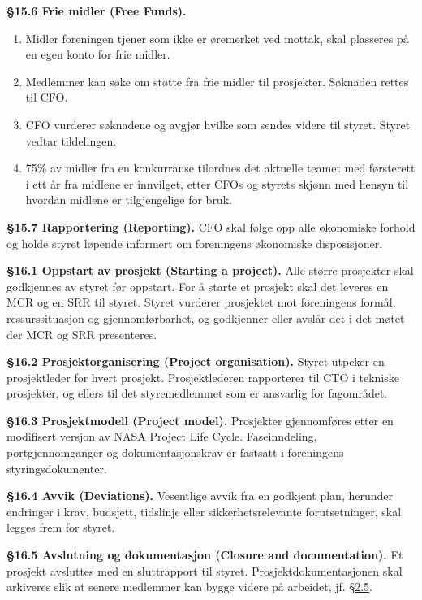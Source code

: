 \documentclass{../../../Common/Latex/Templates/rapport}
\begin{document}
\textbf{\S 15.6 Frie midler (Free Funds).}\label{bylaw:15.6}
\begin{enumerate}
  \item Midler foreningen tjener som ikke er øremerket ved mottak, skal plasseres på en egen konto for frie midler.
  \item Medlemmer kan søke om støtte fra frie midler til prosjekter. Søknaden rettes til CFO.
  \item CFO vurderer søknadene og avgjør hvilke som sendes videre til styret. Styret vedtar tildelingen.
  \item 75\% av midler fra en konkurranse tilordnes det aktuelle teamet med førsterett i ett år fra midlene er innvilget, etter CFOs og styrets skjønn med hensyn til hvordan midlene er tilgjengelige for bruk.
\end{enumerate}

\textbf{\S 15.7 Rapportering (Reporting).}\label{bylaw:15.7} CFO skal følge opp alle økonomiske forhold og holde styret løpende informert om foreningens økonomiske disposisjoner.

\label{bylaw:16}
\textbf{\S 16.1 Oppstart av prosjekt (Starting a project).}\label{bylaw:16.1} Alle større prosjekter skal godkjennes av styret før oppstart. For å starte et prosjekt skal det leveres en MCR og en SRR til styret. Styret vurderer prosjektet mot foreningens formål, ressurssituasjon og gjennomførbarhet, og godkjenner eller avslår det i det møtet der MCR og SRR presenteres.

\textbf{\S 16.2 Prosjektorganisering (Project organisation).}\label{bylaw:16.2} Styret utpeker en prosjektleder for hvert prosjekt. Prosjektlederen rapporterer til CTO i tekniske prosjekter, og ellers til det styremedlemmet som er ansvarlig for fagområdet.

\textbf{\S 16.3 Prosjektmodell (Project model).}\label{bylaw:16.3} Prosjekter gjennomføres etter en modifisert versjon av NASA Project Life Cycle. Faseinndeling, portgjennomganger og dokumentasjonskrav er fastsatt i foreningens styringsdokumenter.

\textbf{\S 16.4 Avvik (Deviations).}\label{bylaw:16.4} Vesentlige avvik fra en godkjent plan, herunder endringer i krav, budsjett, tidslinje eller sikkerhetsrelevante forutsetninger, skal legges frem for styret.

\textbf{\S 16.5 Avslutning og dokumentasjon (Closure and documentation).}\label{bylaw:16.5} Et prosjekt avsluttes med en sluttrapport til styret. Prosjektdokumentasjonen skal arkiveres slik at senere medlemmer kan bygge videre på arbeidet, jf. \hyperref[bylaw:2.5]{\S 2.5}.
\end{document}
